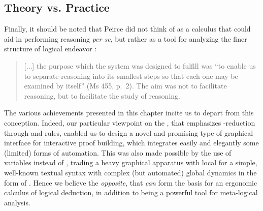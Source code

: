 \begin{scope}
\subsection{Theory vs. Practice}

Finally, it should be noted that Peirce did not think of  as a calculus that
could aid in performing reasoning \emph{per se}, but rather as a tool for
analyzing the finer structure of logical endeavor
\cite[pp.~110--111]{Roberts+1973}:
\begin{quote}
  [...] the purpose which the system was designed to fulfill was ``to enable us
to separate reasoning into its smallest steps so that each one may be examined
by itself'' (Ms 455, p.~2). The aim was not to facilitate reasoning, but to
facilitate the study of reasoning.
\end{quote}

The various achievements presented in this chapter incite us to depart from this
conception. Indeed, our particular viewpoint on the ,
that emphasizes -reduction through  and 
rules, enabled us to design a novel and promising type of graphical interface
for interactive proof building, which integrates easily and elegantly some
(limited) forms of automation. This was also made possible by the use of
variables instead of , trading a heavy graphical apparatus
with local  for a simple, well-known textual syntax with
complex (but automated) global dynamics in the form of . Hence
we believe the \emph{opposite}, that  \emph{can} form the basis for an
ergonomic calculus of logical deduction, in addition to being a powerful tool
for meta-logical analysis.


\end{scope}